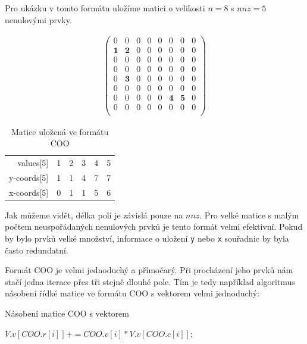 Pro ukázku v tomto formátu uložíme matici o velikosti $n=8$ s $nnz=5$ nenulovými prvky.

\begin{align}
\begin{pmatrix}
	0 & 0 & 0 & 0 & 0 & 0 & 0 & 0 \\
	\boldsymbol{1} & \boldsymbol{2} & 0 & 0 & 0 & 0 & 0 & 0 \\
	0 & 0 & 0 & 0 & 0 & 0 & 0 & 0 \\
	0 & 0 & 0 & 0 & 0 & 0 & 0 & 0 \\
	0 & \boldsymbol{3} & 0 & 0 & 0 & 0 & 0 & 0 \\
	0 & 0 & 0 & 0 & 0 & 0 & 0 & 0 \\
	0 & 0 & 0 & 0 & 0 & \boldsymbol{4} & \boldsymbol{5} & 0 \\
	0 & 0 & 0 & 0 & 0 & 0 & 0 & 0 \\	
\end{pmatrix}
\end{align}

\begin{table}[H]
    \begin{tabular}{r|lllll}
    values[5]   & 1 & 2 & 3 & 4 & 5 \\
    y-coords[5] & 1 & 1 & 4 & 7 & 7 \\
    x-coords[5] & 0 & 1 & 1 & 5 & 6 \\
    \end{tabular}
    \caption{Matice uložená ve formátu COO}
\end{table}

Jak můžeme vidět, délka polí je závislá pouze na $nnz$. Pro velké matice s malým počtem neuspořádaných nenulových prvků je tento formát velmi efektivní. Pokud by bylo prvků velké množství, informace o uložení \texttt{y} nebo \texttt{x} souřadnic by byla často redundatní.

Formát COO je velmi jednoduchý a přímočarý. Při procházení jeho prvků nám stačí jedna iterace přes tři stejně dlouhé pole. Tím je tedy například algoritmus násobení řídké matice ve formátu COO s vektorem velmi jednoduchý:

\begin{algorithm}[H]
	\caption{Násobení matice COO s vektorem}\label{mmm-mvm}
	\begin{algorithmic}[1]
			\State \texttt{$V.v[COO.r[i]] += COO.v[i] * V.v[COO.c[i]];$}
		\EndFor
		\EndProcedure
	\end{algorithmic}
\end{algorithm}


